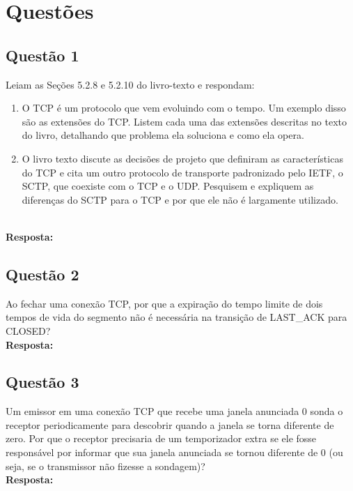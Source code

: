 \section{Questões}\label{sec:questoes}


\subsection{Questão 1}
Leiam as Seções 5.2.8 e 5.2.10 do livro-texto e respondam:
\begin{enumerate}[label=\alph*.]
    \item O TCP é um protocolo que vem evoluindo com o tempo. Um exemplo disso são as
extensões do TCP. Listem cada uma das extensões descritas no texto do livro,
detalhando que problema ela soluciona e como ela opera.
    \item O livro texto discute as decisões de projeto que definiram as características
do TCP e cita um outro protocolo de transporte padronizado pelo IETF, o SCTP,
que coexiste com o TCP e o UDP. Pesquisem e expliquem as diferenças do SCTP para
o TCP e por que ele não é largamente utilizado.
\end{enumerate}\\



\noindent
\textbf{Resposta:} \\


\subsection{Questão 2}
 Ao fechar uma conexão TCP, por que a expiração do tempo limite de dois tempos de vida do
segmento não é necessária na transição de LAST_ACK para CLOSED?\\


\noindent
\textbf{Resposta:}


\subsection{Questão 3}
Um emissor em uma conexão TCP que recebe uma janela anunciada 0 sonda o receptor
periodicamente para descobrir quando a janela se torna diferente de zero. Por que o receptor
precisaria de um temporizador extra se ele fosse responsável por informar que sua janela
anunciada se tornou diferente de 0 (ou seja, se o transmissor não fizesse a sondagem)?\\

\noindent
\textbf{Resposta:}

